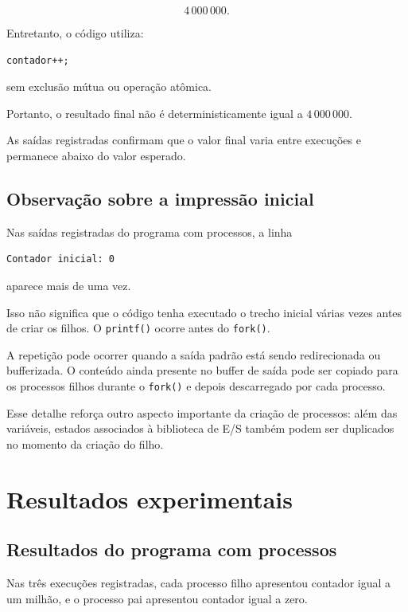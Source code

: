 \begin{equation}
    4\,000\,000.
\end{equation}

Entretanto, o código utiliza:

\begin{verbatim}
contador++;
\end{verbatim}

sem exclusão mútua ou operação atômica.

Portanto, o resultado final não é deterministicamente igual a \(4\,000\,000\).

As saídas registradas confirmam que o valor final varia entre execuções e permanece abaixo do valor esperado.

\subsection{Observação sobre a impressão inicial}

Nas saídas registradas do programa com processos, a linha

\begin{verbatim}
Contador inicial: 0
\end{verbatim}

aparece mais de uma vez.

Isso não significa que o código tenha executado o trecho inicial várias vezes antes de criar os filhos. O \texttt{printf()} ocorre antes do \texttt{fork()}.

A repetição pode ocorrer quando a saída padrão está sendo redirecionada ou bufferizada. O conteúdo ainda presente no buffer de saída pode ser copiado para os processos filhos durante o \texttt{fork()} e depois descarregado por cada processo.

Esse detalhe reforça outro aspecto importante da criação de processos: além das variáveis, estados associados à biblioteca de E/S também podem ser duplicados no momento da criação do filho.

\section{Resultados experimentais}
\label{sec:atvd03-resultados}

\subsection{Resultados do programa com processos}

Nas três execuções registradas, cada processo filho apresentou contador igual a um milhão, e o processo pai apresentou contador igual a zero.

